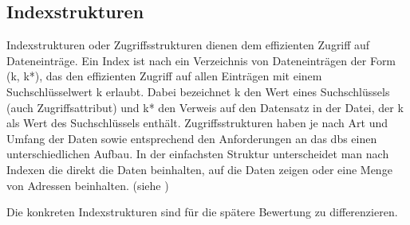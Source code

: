 






\subsection{Indexstrukturen}
Indexstrukturen oder Zugriffsstrukturen dienen dem effizienten Zugriff auf Dateneinträge.
Ein Index ist nach \cite[S.284]{book:kudrass} ein Verzeichnis von Dateneinträgen der Form (k, k*), das den effizienten Zugriff auf allen Einträgen mit einem Suchschlüsselwert k erlaubt. Dabei bezeichnet k den Wert eines Suchschlüssels (auch Zugriffsattribut) und k* den Verweis auf den Datensatz in der Datei, der k als Wert des Suchschlüssels enthält.
Zugriffsstrukturen haben je nach Art und Umfang der Daten sowie entsprechend den Anforderungen an das \Gls{dbs} einen unterschiedlichen Aufbau.
In der einfachsten Struktur unterscheidet man nach Indexen die direkt die Daten beinhalten, auf die Daten zeigen oder eine Menge von Adressen beinhalten. (siehe \cite[S.284]{book:kudrass})

Die konkreten Indexstrukturen sind für die spätere Bewertung zu differenzieren.


